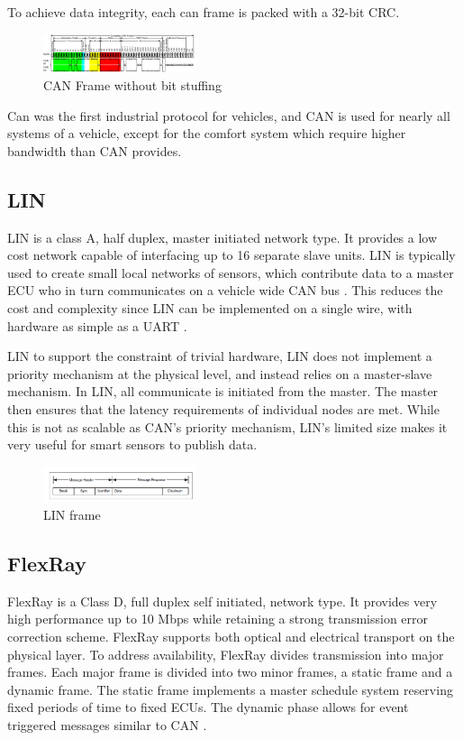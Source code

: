 \documentclass[conference,12pt]{IEEEtran}
\begin{document}
To achieve data integrity, each can frame is packed with a 32-bit CRC. 

\begin{figure}
  \centering
  \includegraphics[width=0.4\textwidth]{can_frame.pdf}
  \caption{CAN Frame without bit stuffing}
  \label{fig:can_frame}
\end{figure}

Can was the first industrial protocol for vehicles, and CAN is used for nearly
all systems of a vehicle, except for the comfort system which require higher
bandwidth than CAN provides.

\subsection{LIN}
LIN is a class A, half duplex, master initiated network type. It provides a low
cost network capable of interfacing up to 16 separate slave units. LIN is
typically used to create small local networks of sensors, which contribute data
to a master ECU who in turn communicates on a vehicle wide CAN bus
\autocite{lukasiewycz_system_2013}.  This reduces the cost and complexity since
LIN can be implemented on a single wire, with hardware as simple as a UART
\autocite{std_lin}.  

LIN to support the constraint of trivial hardware, LIN does not implement
a priority mechanism at the physical level, and instead relies on a master-slave
mechanism. In LIN, all communicate is initiated from the master. The master then
ensures that the latency requirements of individual nodes are met. While this is
not as scalable as CAN's priority mechanism, LIN's limited size makes it very
useful for smart sensors to publish data.

\begin{figure}
  \centering
  \includegraphics[width=0.4\textwidth]{LIN_frame.png}
  \caption{LIN frame}
  \label{fig:lin_frame}
\end{figure}

\subsection{FlexRay}
FlexRay is a Class D, full duplex self initiated, network type. It provides very high performance up to 10
Mbps while retaining a strong transmission error correction scheme.  FlexRay
supports both optical and electrical transport on the physical layer.  To
address availability, FlexRay divides transmission into major frames. Each major
frame is divided into two minor frames, a static frame and a dynamic frame. The
static frame implements a master schedule system reserving fixed periods of
time to fixed ECUs.  The dynamic phase allows for event triggered messages
similar to CAN \autocite{luo_research_2008}.  
\end{document}

